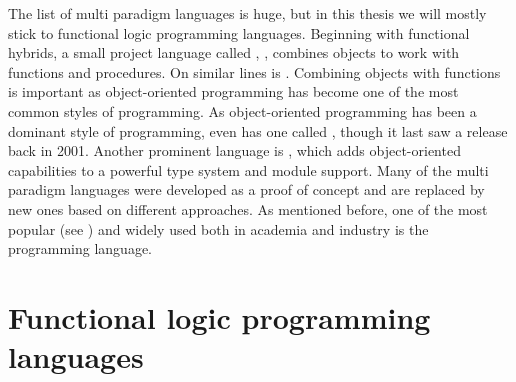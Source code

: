 \documentclass[thesis-solanki.tex]{subfiles}
\begin{document}
The list of multi paradigm languages is huge, but in this thesis we will mostly stick to functional logic
programming languages.
Beginning with functional hybrids, a small project language called , \cite{website:virgil},
combines objects to work with functions and procedures.
On similar lines is  \cite{website:closwiki}.
Combining objects with functions is important as object-oriented programming has become one of the most common
styles of programming.
As object-oriented programming has been a dominant style of programming, even  has one called
 \cite{website:ohaskell}, though it last saw a release back in 2001.
Another prominent language is  \cite{website:ocamlwiki,website:ocamllang}, which adds
object-oriented capabilities to a powerful type system and module support.
Many of the multi paradigm languages were developed as a proof of concept and are replaced by new ones based on
different approaches.
As mentioned before, one of the most popular (see \cite{website:langpop}) and widely used both in academia and
industry is the  \cite{website:scala} programming language.


\section{Functional logic programming languages}
\end{document}
